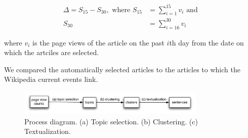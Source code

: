 \documentclass[11pt]{article}
\begin{document}
\begin{align*}
\Delta = S_{15} - S_{30}, \mbox{ where } S_{15} & = \sum_{i=1}^{15} v_i \mbox{ and }\\
S_{30} & = \sum_{i=16}^{30} v_i
\end{align*}

where $v_i$ is the page views of the article on the past $i$th day from the date on which the artciles are selected.

We compared the automatically selected articles to the articles to which the Wikipedia current events link.




\begin{figure}
\centering
\includegraphics[width=0.8\textwidth]{figures/acl11-process.pdf}
\caption{Process diagram. (a) Topic selection. (b) Clustering. (c) Textualization.}
\label{fig:process}
\end{figure}
\end{document}
